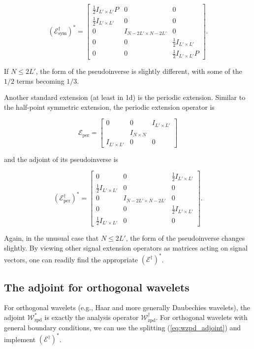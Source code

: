 \documentclass[journal]{IEEEtran}
\begin{document}
\[ \left(\mathcal{E}_\text{sym}^\dagger\right)^\ast = \begin{bmatrix}\frac{1}{2}I_{L'\times L'}P & 0 & 0\\\frac{1}{2}I_{L'\times L'} & 0 & 0\\0 & I_{N-2L'\times N-2L'} & 0\\0&0&\frac{1}{2}I_{L'\times L'}\\0&0&\frac{1}{2}I_{L'\times L'}P\end{bmatrix}. \]

\noindent If ${N \le 2L'}$, the form of the pseudoinverse is slightly different, with some of the $1/2$ terms becoming $1/3$.%

Another standard extension (at least in 1d) is the periodic extension.  Similar to the half-point symmetric extension, the periodic extension operator is

\[ \mathcal{E}_\text{per} = \begin{bmatrix} 0 & 0 & I_{L'\times L'}\\&I_{N\times N}&\\I_{L'\times L'}&0&0\end{bmatrix} \] 

\noindent and the adjoint of its pseudoinverse is

\[ \left(\mathcal{E}_\text{per}^\dagger\right)^\ast = \begin{bmatrix} 0 & 0 & \frac{1}{2}I_{L'\times L'}\\\frac{1}{2}I_{L'\times L'}&0&0\\0&I_{N-2L'\times N-2L'}&0\\0&0&\frac{1}{2}I_{L'\times L'}\\\frac{1}{2}I_{L'\times L'}&0&0\end{bmatrix}. \] 

\noindent Again, in the unusual case that $N\le 2L'$, the form of the pseudoinverse changes slightly.  By viewing other signal extension operators as matrices acting on signal vectors, one can readily find the appropriate $(\mathcal{E}^\dagger)^\ast$.


\subsection{The adjoint for orthogonal wavelets}
For orthogonal wavelets (e.g., Haar and more generally Daubechies wavelets), the adjoint $\mathcal{W}_\text{zpd}^\ast$ is exactly the analysis operator $\mathcal{W}_\text{zpd}^\dagger$.  For orthogonal wavelets with general boundary conditions, we can use the splitting (\ref{eq:wzpd_adjoint}) and implement $\left(\mathcal{E}^\dagger\right)^\ast$.
\end{document}
